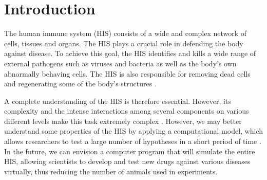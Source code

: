 \documentclass[10pt]{bmc_article}
\newenvironment{bmcformat}{\baselineskip20pt\sloppy\setboolean{publ}{false}}{\baselineskip20pt\sloppy}
\begin{document}
\begin{bmcformat}




\section*{Introduction}

The human immune system (HIS) consists of a wide and complex network of cells, tissues and organs. The HIS plays a crucial role in 
defending the body against disease. To achieve this goal, the HIS identifies and kills a wide range of external pathogens such as 
viruses and bacteria as well as the body's own abnormally behaving cells. The HIS is also responsible for removing dead cells and 
regenerating some of the body's structures \cite{Sompayrac2008}. 

A complete understanding of the HIS is therefore essential. However, its complexity and the intense interactions among several 
components on various different levels make this task extremely complex \cite{icaris11,pedro2012}. However, we may better understand some properties of the 
HIS by applying a computational model, which allows researchers to test a large number of hypotheses in a short period of time \cite{icaris11,pedro2012}. 
In the future, we can envision a computer program that will simulate the entire HIS, allowing scientists to develop and test new 
drugs against various diseases virtually, thus reducing the number of animals used in experiments. 


\end{bmcformat}
\end{document}

